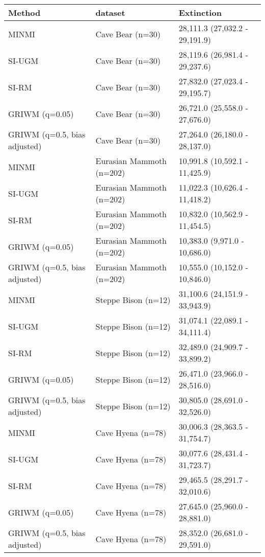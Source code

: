 
\begin{tabular}{lll}
\toprule
Method & dataset & Extinction\\
\midrule
MINMI & Cave Bear (n=30) & 28,111.3 (27,032.2 - 29,191.9)\\
SI-UGM & Cave Bear (n=30) & 28,119.6 (26,981.4 - 29,237.6)\\
SI-RM & Cave Bear (n=30) & 27,832.0 (27,023.4 - 29,195.7)\\
GRIWM (q=0.05) & Cave Bear (n=30) & 26,721.0 (25,558.0 - 27,676.0)\\
GRIWM (q=0.5, bias adjusted) & Cave Bear (n=30) & 27,264.0 (26,180.0 - 28,137.0)\\
\addlinespace
MINMI & Eurasian Mammoth (n=202) & 10,991.8 (10,592.1 - 11,425.9)\\
SI-UGM & Eurasian Mammoth (n=202) & 11,022.3 (10,626.4 - 11,418.2)\\
SI-RM & Eurasian Mammoth (n=202) & 10,832.0 (10,562.9 - 11,454.5)\\
GRIWM (q=0.05) & Eurasian Mammoth (n=202) & 10,383.0 (9,971.0 - 10,686.0)\\
GRIWM (q=0.5, bias adjusted) & Eurasian Mammoth (n=202) & 10,555.0 (10,152.0 - 10,846.0)\\
\addlinespace
MINMI & Steppe Bison (n=12) & 31,100.6 (24,151.9 - 33,943.9)\\
SI-UGM & Steppe Bison (n=12) & 31,074.1 (22,089.1 - 34,111.4)\\
SI-RM & Steppe Bison (n=12) & 32,489.0 (24,909.7 - 33,899.2)\\
GRIWM (q=0.05) & Steppe Bison (n=12) & 26,471.0 (23,966.0 - 28,516.0)\\
GRIWM (q=0.5, bias adjusted) & Steppe Bison (n=12) & 30,805.0 (28,691.0 - 32,526.0)\\
\addlinespace
MINMI & Cave Hyena (n=78) & 30,006.3 (28,363.5 - 31,754.7)\\
SI-UGM & Cave Hyena (n=78) & 30,077.6 (28,431.4 - 31,723.7)\\
SI-RM & Cave Hyena (n=78) & 29,465.5 (28,291.7 - 32,010.6)\\
GRIWM (q=0.05) & Cave Hyena (n=78) & 27,645.0 (25,960.0 - 28,881.0)\\
GRIWM (q=0.5, bias adjusted) & Cave Hyena (n=78) & 28,352.0 (26,681.0 - 29,591.0)\\
\bottomrule
\end{tabular}
